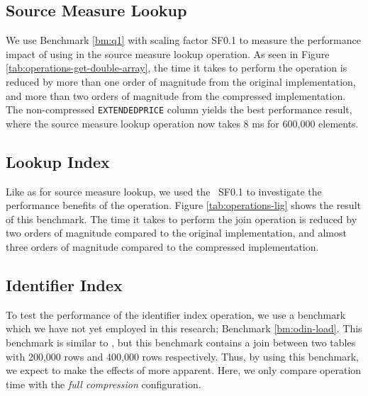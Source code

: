 \subsection{Source Measure Lookup}
\label{sub:Source Measure Lookup}

We use Benchmark \ref{bm:q1} with scaling factor SF0.1 to measure the performance impact of using  in the source measure lookup operation. As seen in Figure \ref{tab:operations-get-double-array}, the time it takes to perform the operation is reduced by more than one order of magnitude from the original implementation, and more than two orders of magnitude from the compressed implementation. The non-compressed \texttt{EXTENDEDPRICE} column yields the best performance result, where the source measure lookup operation now takes 8 ms for 600,000 elements.

\subsection{Lookup Index}
\label{sub:Lookup Index}


Like as for source measure lookup, we used the \tpchdl~SF0.1 to investigate the performance benefits of the  operation. Figure \ref{tab:operations-lig} shows the result of this benchmark. The time it takes to perform the join operation is reduced by two orders of magnitude compared to the original implementation, and almost three orders of magnitude compared to the compressed implementation.

\subsection{Identifier Index}
\label{sub:Identifier Index}
To test the performance of the identifier index operation, we use a benchmark which we have not yet employed in this research; Benchmark \ref{bm:odin-load}. This benchmark is similar to \tpchdl, but this benchmark contains a join between two tables with 200,000 rows and 400,000 rows respectively. Thus, by using this benchmark, we expect to make the effects of  more apparent. Here, we only compare operation time with the \textit{full compression} configuration.

